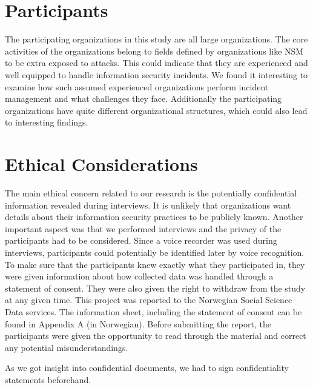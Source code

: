 \section{Participants}
The participating organizations in this study are all large organizations. The core activities of the organizations belong to fields defined by organizations like \acs{NSM} to be extra exposed to attacks. This could indicate that they are experienced and well equipped to handle information security incidents. We found it interesting to examine how such assumed experienced organizations perform incident management and what challenges they face. Additionally the participating organizations have quite different organizational structures, which could also lead to interesting findings.

\section{Ethical Considerations}
\label{sec:ethical}
The main ethical concern related to our research is the potentially confidential information revealed during interviews. It is unlikely that organizations want details about their information security practices to be publicly known. Another important aspect was that we performed interviews and the privacy of the participants had to be considered. Since a voice recorder was used during interviews, participants could potentially be identified later by voice recognition. To make sure that the participants knew exactly what they participated in, they were given information about how collected data was handled through a statement of consent. They were also given the right to withdraw from the study at any given time. This project was reported to the Norwegian Social Science Data services. The information sheet, including the statement of consent can be found in Appendix A (in Norwegian). Before submitting the report, the participants were given the opportunity to read through the material and correct any potential misunderstandings.   

As we got insight into confidential documents, we had to sign confidentiality statements beforehand.


